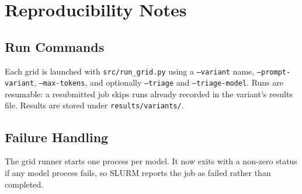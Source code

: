 \documentclass[a4paper, 12pt]{report}
\theoremstyle{definition}
\begin{document}
\appendix
\chapter{Reproducibility Notes}
\section{Run Commands}
Each grid is launched with \texttt{src/run\_grid.py} using a \texttt{--variant} name, \texttt{--prompt-variant}, \texttt{--max-tokens}, and optionally \texttt{--triage} and \texttt{--triage-model}. Runs are resumable: a resubmitted job skips runs already recorded in the variant's results file. Results are stored under \texttt{results/variants/}.

\section{Failure Handling}
The grid runner starts one process per model. It now exits with a non-zero status if any model process fails, so SLURM reports the job as failed rather than completed.
\end{document}
